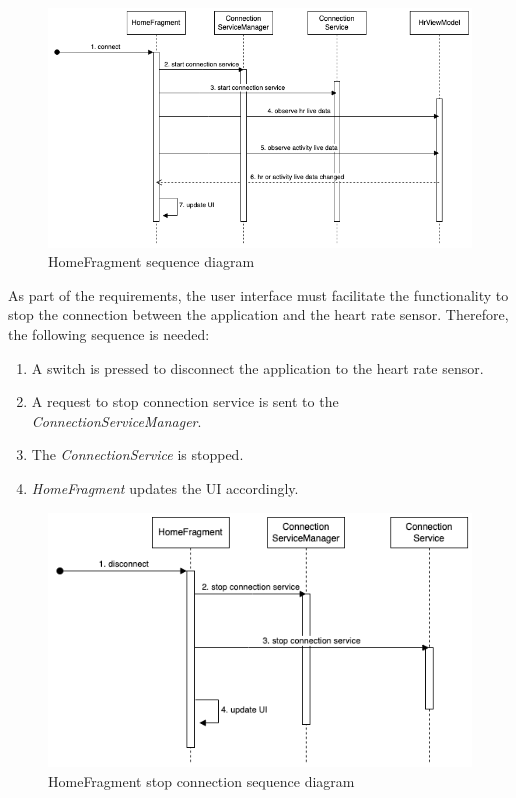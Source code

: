 \begin{figure}[H]
    \centering
    \includegraphics[width=1\textwidth]{diagrams/hr-broadcast-homefragment.drawio.png}
    \caption{HomeFragment sequence diagram}
    \label{fig:homefragment_diagram}
\end{figure}

As part of the requirements, the user interface must facilitate the functionality to stop the connection between the application and the heart rate sensor. Therefore, the following sequence is needed:
\begin{enumerate}
    \item A switch is pressed to disconnect the application to the heart rate sensor.
    \item A request to stop connection service is sent to the \emph{ConnectionServiceManager}.
    \item The \emph{ConnectionService} is stopped.
    \item \emph{HomeFragment} updates the UI accordingly.
\end{enumerate}

\begin{figure}[H]
    \centering
    \includegraphics[width=1\textwidth]{diagrams/stop-connection-service-homefragment.drawio.png}
    \caption{HomeFragment stop connection sequence diagram}
    \label{fig:homefragment_stop_connection_diagram}
\end{figure}


